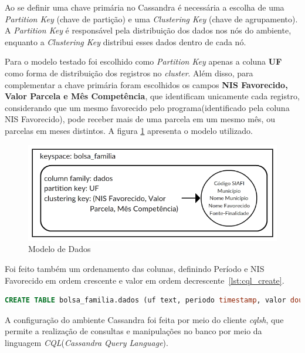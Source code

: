 Ao se definir uma chave primária no Cassandra é necessária a escolha de uma \emph{Partition Key} (chave de partição) e uma \emph{Clustering Key} (chave de agrupamento). A \emph{Partition Key} é responsável pela distribuição dos dados nos nós do ambiente, enquanto a \emph{Clustering Key} distribui esses dados dentro de cada nó.

Para o modelo testado foi escolhido como \emph{Partition Key} apenas a coluna \textbf{UF} como forma de distribuição dos registros no \emph{cluster}. Além disso, para complementar a chave primária foram escolhidos os campos \textbf{NIS Favorecido, Valor Parcela e Mês Competência}, que identificam unicamente cada registro, considerando que um mesmo favorecido pelo programa(identificado pela coluna NIS Favorecido), pode receber mais de uma parcela em um mesmo mês, ou parcelas em meses distintos. A figura \ref{fig:modelocassandra} apresenta o modelo utilizado.

\begin{figure}[!htb]
	\centering
	\includegraphics[width=1\textwidth]{figuras/modelocassandra.png}
	\caption{Modelo de Dados}
	\label{fig:modelocassandra}
\end{figure}

Foi feito também um ordenamento das colunas, definindo Período e NIS Favorecido em ordem crescente e valor em ordem decrescente~\ref{lst:cql_create}. 

\begin{lstlisting}[caption={Código CQL criação da tabela},label={lst:cql_create},language=SQL]
CREATE TABLE bolsa_familia.dados (uf text, periodo timestamp, valor double, nis_favorecido bigint, cod_municipio int, fonte text, nome_favorecido text, nome_municipio text, PRIMARY KEY(uf, periodo, valor, nis_favorecido)) WITH CLUSTERING ORDER BY(periodo ASC, valor DESC, nis_favorecido ASC);
\end{lstlisting}

A configuração do ambiente Cassandra foi feita por meio do cliente \emph{cqlsh}, que permite a realização de consultas e manipulações no banco por meio da linguagem \emph{CQL}(\emph{Cassandra Query Language}).

